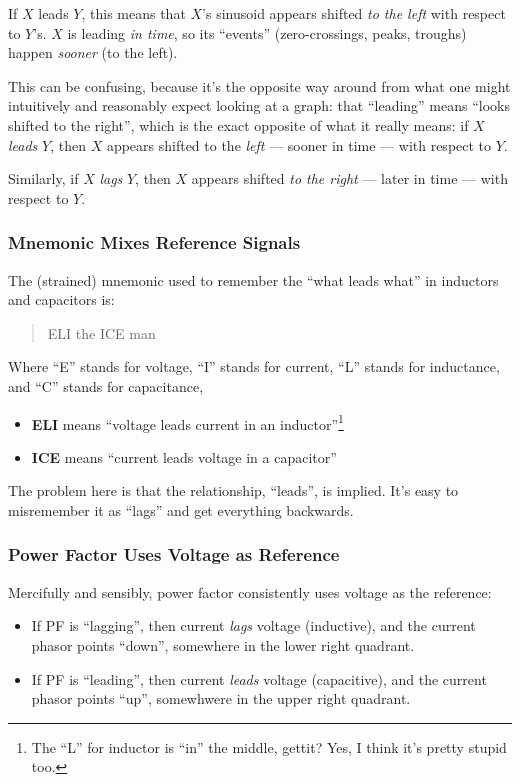 \documentclass[11pt]{article}
\begin{document}
If $X$ leads $Y$, this means that $X$'s sinusoid appears shifted
\emph{to the left} with respect to $Y$'s. $X$ is leading \emph{in
  time}, so its ``events'' (zero-crossings, peaks, troughs) happen
\emph{sooner} (to the left).

This can be confusing, because it's the opposite way around from what
one might intuitively and reasonably expect looking at a graph: that
``leading'' means ``looks shifted to the right'', which is the exact
opposite of what it really means: if $X$ \emph{leads} $Y$, then $X$
appears shifted to the \emph{left} --- sooner in time --- with respect
to $Y$.

Similarly, if $X$ \emph{lags} $Y$, then $X$ appears shifted \emph{to
  the right} --- later in time --- with respect to $Y$.

\subsubsection{Mnemonic Mixes Reference Signals}

The (strained) mnemonic used to remember the ``what leads
what'' in inductors and capacitors is:

\begin{quote}
\centering
ELI the ICE man
\end{quote}

Where ``E'' stands for voltage, ``I'' stands for current, ``L''
stands for inductance, and ``C'' stands for capacitance,

\begin{itemize}
  \item {\bf ELI} means ``voltage leads current in an inductor''\footnote{The ``L'' for inductor is ``in'' the middle, gettit? Yes, I think it's pretty stupid too.}
  \item {\bf ICE} means ``current leads voltage in a capacitor''
\end{itemize}

The problem here is that the relationship, ``leads'', is implied. It's
easy to misremember it as ``lags'' and get everything backwards.


\subsubsection{Power Factor Uses Voltage as Reference}

Mercifully and sensibly, power factor consistently uses voltage as the reference:

\begin{itemize}
  \item If PF is ``lagging'', then current \emph{lags} voltage
    (inductive), and the current phasor points ``down'', somewhere in
    the lower right quadrant.
  \item If PF is ``leading'', then current \emph{leads} voltage (capacitive), and the current phasor points ``up'', somewhwere in the upper right quadrant.
\end{itemize}
\end{document}
